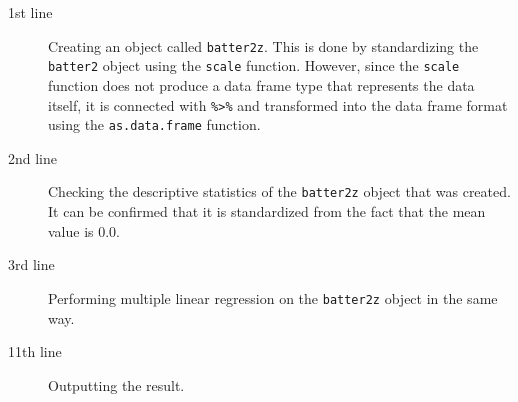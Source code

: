 \begin{description}
	\item[1st line] Creating an object called \texttt{batter2z}. This is done by standardizing the \texttt{batter2} object using the \verb|scale| function. However, since the \verb|scale| function does not produce a data frame type that represents the data itself, it is connected with \verb|%>%| and transformed into the data frame format using the \verb|as.data.frame| function.
	\item[2nd line] Checking the descriptive statistics of the \texttt{batter2z} object that was created. It can be confirmed that it is standardized from the fact that the mean value is 0.0.
	\item[3rd line] Performing multiple linear regression on the \texttt{batter2z} object in the same way.
	\item[11th line] Outputting the result.
\end{description}
